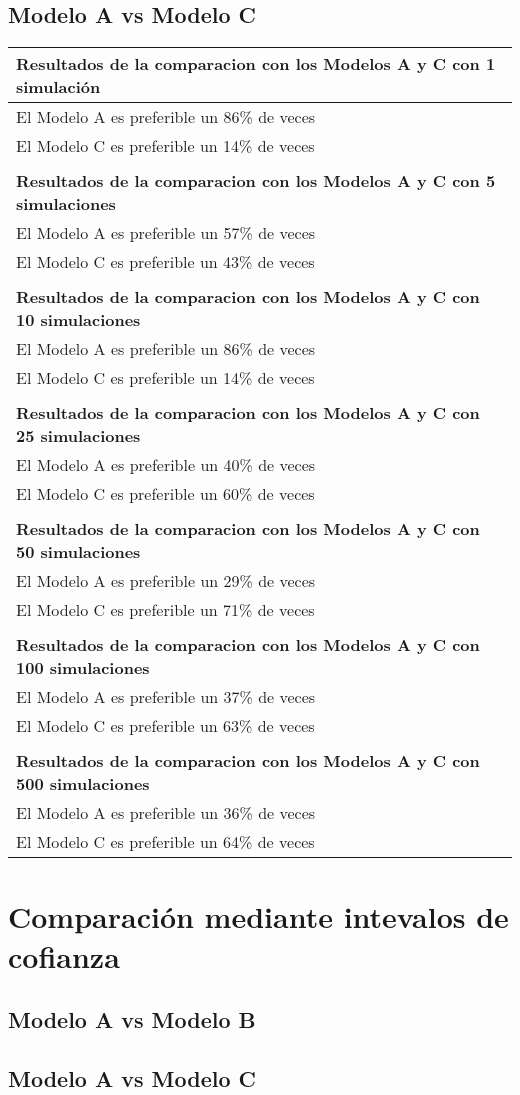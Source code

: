 \subsection{Modelo A vs Modelo C}
\begin{table}[H]
\centering
\begin{tabular}{|l|}
\hline
\textbf{Resultados de la comparacion con los Modelos A  y C con 1 simulación} \\ \hline
El Modelo A es preferible un 86\% de veces \\ \hline
El Modelo C es preferible un 14\% de veces \\ \hline
 \\ \hline
\textbf{Resultados de la comparacion con los Modelos A  y C con 5 simulaciones} \\ \hline
El Modelo A es preferible un 57\% de veces \\ \hline
El Modelo C es preferible un 43\% de veces \\ \hline
 \\ \hline
\textbf{Resultados de la comparacion con los Modelos A  y C con 10 simulaciones} \\ \hline
El Modelo A es preferible un 86\% de veces \\ \hline
El Modelo C es preferible un 14\% de veces \\ \hline
 \\ \hline
\textbf{Resultados de la comparacion con los Modelos A  y C con 25 simulaciones} \\ \hline
El Modelo A es preferible un 40\% de veces \\ \hline
El Modelo C es preferible un 60\% de veces \\ \hline
 \\ \hline
\textbf{Resultados de la comparacion con los Modelos A  y C con 50 simulaciones} \\ \hline
El Modelo A es preferible un 29\% de veces \\ \hline
El Modelo C es preferible un 71\% de veces \\ \hline
 \\ \hline
\textbf{Resultados de la comparacion con los Modelos A  y C con 100 simulaciones} \\ \hline
El Modelo A es preferible un 37\% de veces \\ \hline
El Modelo C es preferible un 63\% de veces \\ \hline
 \\ \hline
\textbf{Resultados de la comparacion con los Modelos A  y C con 500 simulaciones} \\ \hline
El Modelo A es preferible un 36\% de veces \\ \hline
El Modelo C es preferible un 64\% de veces \\ \hline
\end{tabular}
\end{table}
\section{Comparación mediante intevalos de cofianza}

\subsection{Modelo A vs Modelo B}

\subsection{Modelo A vs Modelo C}
